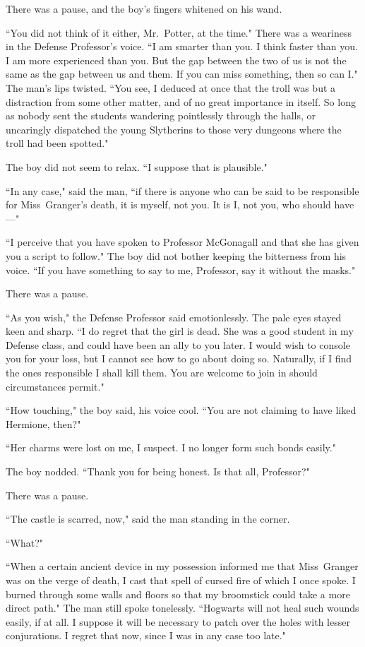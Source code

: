 There was a pause, and the boy's fingers whitened on his wand.

``You did not think of it either, Mr.~Potter, at the time." There was a weariness in the Defense Professor's voice. ``I am smarter than you. I think faster than you. I am more experienced than you. But the gap between the two of us is not the same as the gap between us and them. If you can miss something, then so can I." The man's lips twisted. ``You see, I deduced at once that the troll was but a distraction from some other matter, and of no great importance in itself. So long as nobody sent the students wandering pointlessly through the halls, or uncaringly dispatched the young Slytherins to those very dungeons where the troll had been spotted."

The boy did not seem to relax. ``I suppose that is plausible."

``In any case," said the man, ``if there is anyone who can be said to be responsible for Miss~Granger's death, it is myself, not you. It is I, not you, who should have---"

``I perceive that you have spoken to Professor McGonagall and that she has given you a script to follow." The boy did not bother keeping the bitterness from his voice. ``If you have something to say to me, Professor, say it without the masks."

There was a pause.

``As you wish," the Defense Professor said emotionlessly. The pale eyes stayed keen and sharp. ``I do regret that the girl is dead. She was a good student in my Defense class, and could have been an ally to you later. I would wish to console you for your loss, but I cannot see how to go about doing so. Naturally, if I find the ones responsible I shall kill them. You are welcome to join in should circumstances permit."

``How touching," the boy said, his voice cool. ``You are not claiming to have liked Hermione, then?"

``Her charms were lost on me, I suspect. I no longer form such bonds easily."

The boy nodded. ``Thank you for being honest. Is that all, Professor?"

There was a pause.

``The castle is scarred, now," said the man standing in the corner.

``What?"

``When a certain ancient device in my possession informed me that Miss~Granger was on the verge of death, I cast that spell of cursed fire of which I once spoke. I burned through some walls and floors so that my broomstick could take a more direct path." The man still spoke tonelessly. ``Hogwarts will not heal such wounds easily, if at all. I suppose it will be necessary to patch over the holes with lesser conjurations. I regret that now, since I was in any case too late."

